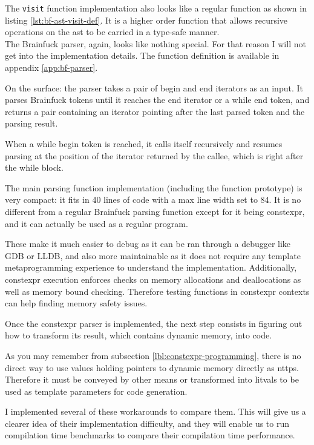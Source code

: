 \documentclass[../main]{subfiles}
\begin{document}
The \lstinline{visit} function implementation also looks like a regular \cpp
function as shown in listing \ref{lst:bf-ast-visit-def}.
It is a higher order function that allows recursive operations on the \gls{ast}
to be carried in a type-safe manner.
\\

The Brainfuck parser, again, looks like nothing special. For that reason I will
not get into the implementation details. The function definition is available
in appendix \ref{app:bf-parser}.

On the surface: the parser takes a pair of begin and end iterators as an input.
It parses Brainfuck tokens until it reaches the end iterator or a while end
token, and returns a pair containing an iterator pointing after the last parsed
token and the parsing result.

When a while begin token is reached, it calls itself recursively and resumes
parsing at the position of the iterator returned by the callee, which is right
after the while block.

The main parsing function implementation (including the function prototype)
is very compact: it fits in 40 lines of code with a max line width set to 84.
It is no different from a regular Brainfuck parsing function except for it being
\gls{constexpr}, and it can actually be used as a regular \cpp program.

These make it much easier to debug as it can be ran through a \cpp debugger like
GDB or LLDB, and also more maintainable as it does not require any
template metaprogramming experience to understand the implementation.
Additionally, \gls{constexpr} execution enforces checks on memory allocations and
deallocations as well as memory bound checking. Therefore testing functions
in \gls{constexpr} contexts can help finding memory safety issues.

Once the \gls{constexpr} parser is implemented, the next step consists in
figuring out how to transform its result, which contains dynamic memory,
into \cpp code.

As you may remember from subsection \ref{lbl:constexpr-programming},
there is no direct way to use values holding pointers to dynamic memory
directly as \glspl{nttp}.
Therefore it must be conveyed by other means or transformed into \glspl{litval}
to be used as template parameters for \cpp code generation.

I implemented several of these workarounds to compare them.
This will give us a clearer idea of their implementation difficulty,
and they will enable us to run compilation time benchmarks to compare their
compilation time performance.
\end{document}
